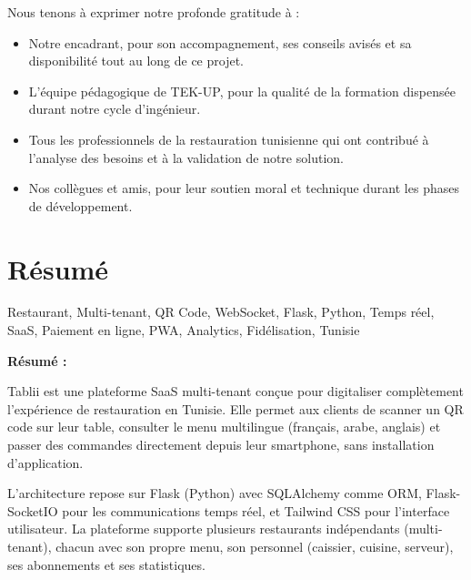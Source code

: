 \documentclass[12pt,a4paper]{report}
\begin{document}
Nous tenons \`a exprimer notre profonde gratitude \`a :

\begin{itemize}[leftmargin=2cm, itemsep=0.5cm]
    \item Notre encadrant, pour son accompagnement, ses conseils avis\'es et sa disponibilit\'e tout au long de ce projet.
    \item L'\'equipe p\'edagogique de TEK-UP, pour la qualit\'e de la formation dispens\'ee durant notre cycle d'ing\'enieur.
    \item Tous les professionnels de la restauration tunisienne qui ont contribu\'e \`a l'analyse des besoins et \`a la validation de notre solution.
    \item Nos coll\`egues et amis, pour leur soutien moral et technique durant les phases de d\'eveloppement.
\end{itemize}

\cleardoublepage
\chapter*{R\'esum\'e}

\begin{summarybox}[Mots-cl\'es]
Restaurant, Multi-tenant, QR Code, WebSocket, Flask, Python, Temps r\'eel, SaaS, Paiement en ligne, PWA, Analytics, Fid\'elisation, Tunisie
\end{summarybox}

\vspace{0.5cm}

\textbf{R\'esum\'e :}

Tablii est une plateforme SaaS multi-tenant con\c{c}ue pour digitaliser compl\`etement 
l'exp\'erience de restauration en Tunisie. Elle permet aux clients de scanner un QR code sur leur table, 
consulter le menu multilingue (fran\c{c}ais, arabe, anglais) et passer des commandes directement 
depuis leur smartphone, sans installation d'application.

L'architecture repose sur Flask (Python) avec SQLAlchemy comme ORM, Flask-SocketIO pour les 
communications temps r\'eel, et Tailwind CSS pour l'interface utilisateur. La plateforme supporte 
plusieurs restaurants ind\'ependants (multi-tenant), chacun avec son propre menu, son personnel 
(caissier, cuisine, serveur), ses abonnements et ses statistiques.
\end{document}
